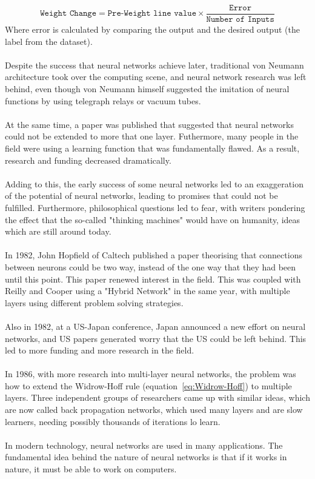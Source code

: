 \documentclass[titlepage]{article}
\begin{document}
\begin{equation} \label{eq:Widrow-Hoff}
    \texttt{Weight Change} = \texttt{Pre-Weight line value}\times \frac{\texttt{Error}}{\texttt{Number of Inputs}}
\end{equation}
Where error is calculated by comparing the output and the desired output (the label from the dataset).
\\\\
Despite the success that neural networks achieve later, traditional von Neumann architecture took over the computing scene, and neural network research was left behind, even though von Neumann himself suggested the imitation of neural functions by using telegraph relays or vacuum tubes.
\\\\
At the same time, a paper was published that suggested that neural networks could not be extended to more that one layer. Futhermore, many people in the field were using a learning function that was fundamentally flawed. As a result, research and funding decreased dramatically.
\\\\
Adding to this, the early success of some neural networks led to an exaggeration of the potential of neural networks, leading to promises that could not be fulfilled. Furthermore, philosophical questions led to fear, with writers pondering the effect that the so-called "thinking machines" would have on humanity, ideas which are still around today.
\\\\
In 1982, John Hopfield of Caltech published a paper theorising that connections between neurons could be two way, instead of the one way that they had been until this point. This paper renewed interest in the field. This was coupled with Reilly and Cooper using a "Hybrid Network" in the same year, with multiple layers using different problem solving strategies.
\\\\
Also in 1982, at a US-Japan conference, Japan announced a new effort on neural networks, and US papers generated worry that the US could be left behind. This led to more funding and more research in the field.
\\\\
In 1986, with more research into multi-layer neural networks, the problem was how to extend the Widrow-Hoff rule (equation~\ref{eq:Widrow-Hoff}) to multiple layers. Three independent groups of researchers came up with similar ideas, which are now called back propagation networks, which used many layers and are slow learners, needing possibly thousands of iterations lo learn.
\\\\
In modern technology, neural networks are used in many applications. The fundamental idea behind the nature of neural networks is that if it works in nature, it must be able to work on computers.
\newpage
\end{document}
